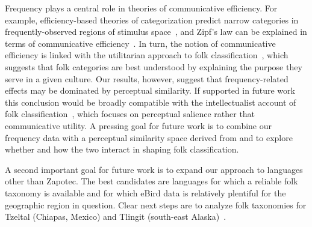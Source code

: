 \documentclass[10pt,letterpaper]{article}
\begin{document}
Frequency plays a central role in theories of communicative efficiency. For example, efficiency-based theories of categorization predict narrow categories in frequently-observed regions of stimulus space~\cite{regierck16}, and Zipf's law can be explained in terms of communicative efficiency~\cite{ferrericanchos03}. In turn, the notion of communicative efficiency is linked with the utilitarian approach to folk classification~\cite{hunn1982utilitarian}, which suggests that folk categories are best understood by explaining the purpose they serve in a given culture. Our results, however, suggest that frequency-related effects may be dominated by perceptual similarity. If supported in future work this conclusion would be broadly compatible with the intellectualist account of folk classification~\cite{berlin2014ethnobiological}, which focuses on perceptual salience rather that communicative utility. A pressing goal for future work is to combine our frequency data with a perceptual similarity space derived from \cite{pigot2020macroevolutionary} and to explore whether and how the two interact in shaping folk classification. 

A second important goal for future work is to expand our approach to languages other than Zapotec. The best candidates are languages for which a reliable folk taxonomy is available and for which eBird data  
is relatively plentiful for the geographic region in question.  Clear next steps are to analyze folk taxonomies for Tzeltal (Chiapas, Mexico)  and Tlingit (south-east Alaska)~\cite{hunn1977tzeltal,hunn2012tlingit}.





\end{document}
